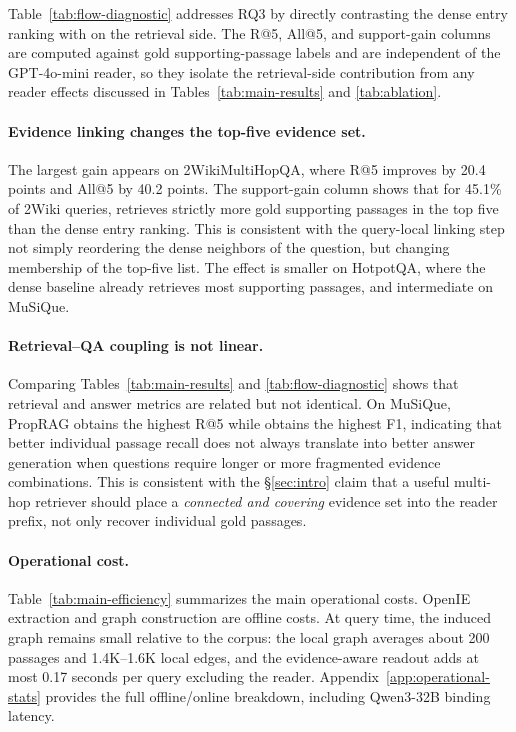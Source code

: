 Table~\ref{tab:flow-diagnostic} addresses RQ3 by directly contrasting
the dense entry ranking with \methodname{} on the retrieval side.
The R@5, All@5, and support-gain columns are computed against gold
supporting-passage labels and are independent of the GPT-4o-mini
reader, so they isolate the retrieval-side contribution from any
reader effects discussed in Tables~\ref{tab:main-results} and
\ref{tab:ablation}.
\paragraph{Evidence linking changes the top-five evidence set.}
The largest gain appears on 2WikiMultiHopQA, where R@5 improves by
20.4 points and All@5 by 40.2 points. The support-gain column shows
that for 45.1\% of 2Wiki queries, \methodname{} retrieves strictly
more gold supporting passages in the top five than the dense entry
ranking. This is consistent with the query-local linking step not simply
reordering the dense neighbors of the question, but changing
membership of the top-five list. The effect is smaller on HotpotQA,
where the dense baseline already retrieves most supporting passages,
and intermediate on MuSiQue.

\paragraph{Retrieval--QA coupling is not linear.}
Comparing Tables~\ref{tab:main-results} and \ref{tab:flow-diagnostic}
shows that retrieval and answer metrics are related but not identical.
On MuSiQue, PropRAG obtains the highest R@5 while \methodname{} obtains
the highest F1, indicating that better individual passage recall does
not always translate into better answer generation when questions
require longer or more fragmented evidence combinations. This is
consistent with the \S\ref{sec:intro} claim that a useful multi-hop
retriever should place a \emph{connected and covering} evidence set
into the reader prefix, not only recover individual gold passages.

\paragraph{Operational cost.}
Table~\ref{tab:main-efficiency} summarizes the main operational costs.
OpenIE extraction and graph construction are offline costs. At query
time, the induced graph remains small relative to the corpus: the
local graph averages about 200 passages and 1.4K--1.6K local edges, and
the evidence-aware readout adds at most 0.17 seconds per query
excluding the reader. Appendix~\ref{app:operational-stats} provides the
full offline/online breakdown, including Qwen3-32B binding latency.

